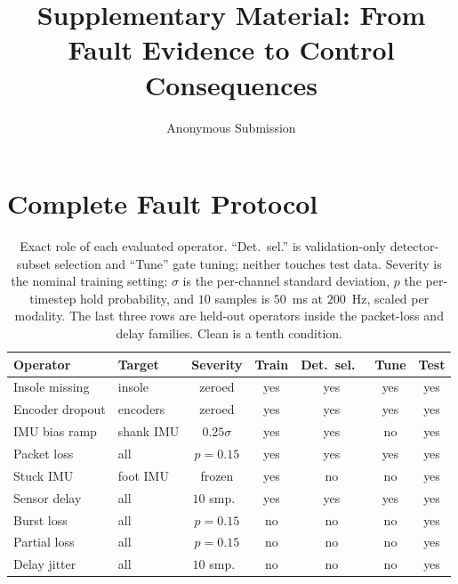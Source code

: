 \documentclass[letterpaper]{article}
\title{Supplementary Material: From Fault Evidence to Control Consequences}
\author{Anonymous Submission}
\date{}
\begin{document}
\maketitle

\section{Complete Fault Protocol}

\begin{table}[t]
\centering
\scriptsize
\setlength{\tabcolsep}{2.2pt}
\renewcommand{\arraystretch}{0.93}
\begin{tabular}{@{}llccccc@{}}
\toprule
Operator & Target & Severity & Train & Det.\ sel.\ & Tune & Test\\
\midrule
Insole missing & insole & zeroed & yes & yes & yes & yes\\
Encoder dropout & encoders & zeroed & yes & yes & yes & yes\\
IMU bias ramp & shank IMU & $0.25\sigma$ & yes & yes & no & yes\\
Packet loss & all & $p{=}0.15$ & yes & yes & yes & yes\\
Stuck IMU & foot IMU & frozen & yes & no & no & yes\\
Sensor delay & all & $10$ smp.\ & yes & yes & yes & yes\\
\midrule
Burst loss & all & $p{=}0.15$ & no & no & no & yes\\
Partial loss & all & $p{=}0.15$ & no & no & no & yes\\
Delay jitter & all & $10$ smp.\ & no & no & no & yes\\
\bottomrule
\end{tabular}
\caption{Exact role of each evaluated operator. ``Det.\ sel.'' is
validation-only detector-subset selection and ``Tune'' gate tuning; neither
touches test data. Severity is the nominal training setting: $\sigma$ is the
per-channel standard deviation, $p$ the per-timestep hold probability, and $10$
samples is $50$~ms at $200$~Hz, scaled per modality. The last three rows are
held-out operators inside the packet-loss and delay families. Clean is a tenth
condition.}
\label{tab:fault-protocol}
\end{table}
\end{document}
